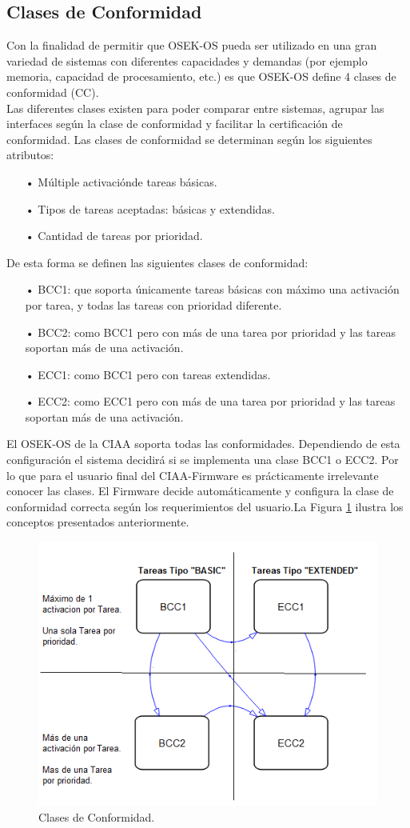 \documentclass[12pt,letterpaper]{article}
\begin{document}
\subsection{Clases de Conformidad}
Con la finalidad de permitir que OSEK-OS pueda ser utilizado en una gran variedad de sistemas con diferentes capacidades y demandas (por ejemplo memoria, capacidad de procesamiento, etc.) es que OSEK-OS define 4 clases de conformidad (CC).
 \\
 
Las diferentes clases existen para poder comparar entre sistemas, agrupar las interfaces según la clase de conformidad y facilitar la certificación de conformidad. Las clases de conformidad se determinan según los siguientes atributos: 

\begin{enumerate}
\item[•]Múltiple activaciónde tareas básicas.
\item[•]Tipos de tareas aceptadas: básicas y extendidas.
\item[•]Cantidad de tareas por prioridad.
\end{enumerate}

De esta forma se definen las siguientes clases de conformidad:
\begin{enumerate}
\item[•]BCC1: que soporta únicamente tareas  básicas con máximo una activación por tarea, y todas las tareas con prioridad diferente.
\item[•]BCC2: como  BCC1 pero con más de una tarea por prioridad y las tareas soportan más de una activación.
\item[•]ECC1: como BCC1 pero con tareas extendidas.
\item[•]ECC2: como  ECC1 pero con más de una tarea por prioridad y las tareas soportan más de una activación.
\end{enumerate}
El OSEK-OS de la CIAA soporta todas las conformidades. Dependiendo de esta configuración el sistema decidirá si se implementa una clase BCC1 o ECC2. Por lo que para el usuario final del CIAA-Firmware es prácticamente irrelevante conocer las clases. El Firmware decide automáticamente y configura la clase de conformidad correcta según los requerimientos del usuario.La Figura \ref{Fig34} ilustra los conceptos presentados anteriormente.


\begin{figure}[H]
\centering
\includegraphics[width=8 cm]{figuras/f17.png}
\caption{Clases de Conformidad.}
\label{Fig34}
\end{figure}
\end{document}
